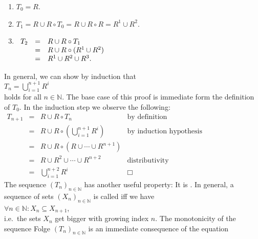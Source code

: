 \begin{enumerate}
\item $T_0 = R$.
\item $T_1 = R \cup R \circ T_0 = R \cup R \circ R = R^1 \cup R^2$.
\item$\begin{array}[t]{lcl}
       T_2  & = & R \cup R \circ T_1 \\
            & = & R \cup R \circ (R^1 \cup R^2) \\
            & = & R^1 \cup R^2 \cup R^3. \\
       \end{array}
      $
\end{enumerate}
In general, we can show by induction that
\\[0.2cm]
\hspace*{1.3cm}
$T_n = \bigcup\limits_{i=1}^{n+1} R^i$
\\[0.2cm]
holds for all $n \in \mathbb{N}$.  The base case of this proof is immediate form the definition of $T_0$.
In the induction step we observe the following:
\\[0.2cm]
\hspace*{1.3cm}
$
 \begin{array}{lcll}
   T_{n+1} & = & R \cup R \circ T_n & \mbox{by definition} \\[0.2cm]
           & = & R \cup R \circ \left(\bigcup\limits_{i=1}^{n+1} R^i\right) &
                 \mbox{by induction hypothesis} \\[0.4cm]
           & = & R \cup R \circ \left(R \cup \cdots \cup R^{n+1}\right) \\[0.2cm] 
           & = & R \cup R^2 \cup \cdots \cup R^{n+2}  &
                 \mbox{distributivity} \\[0.2cm]
           & = & \bigcup\limits_{i=1}^{n+2} R^i & \Box 
   \end{array}
$
\\[0.2cm]
The sequence $(T_n)_{n\in\mathbb{N}}$ has another useful property:  It is 
.  In general, a sequence of sets $(X_n)_{n\in\mathbb{N}}$ is called
 iff we have
\\[0.2cm]
\hspace*{1.3cm}
$\forall n \in \mathbb{N}: X_n \subseteq X_{n+1}$,
\\[0.2cm]
i.e.~the sets $X_n$ get bigger with growing index $n$.
The monotonicity of the sequence Folge $(T_n)_{n \in \mathbb{N}}$ is an immediate consequence of the equation
\\[0.2cm]

